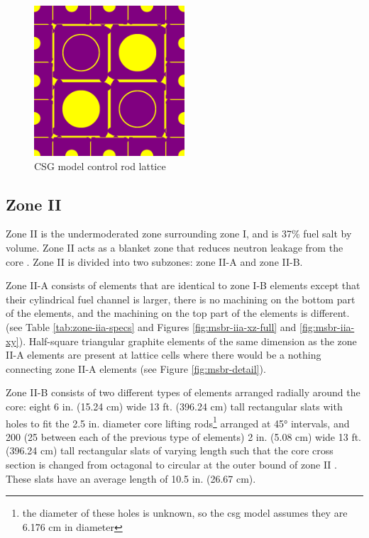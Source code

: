 \begin{figure}[htpb]
    \centering
    \includegraphics[width=0.5\textwidth]{figs/ch4/cr_xy_openmc.png}
    \caption{CSG model control rod lattice}
    \label{fig:control-rods}
\end{figure}


\subsection{Zone II}

Zone II is the undermoderated zone surrounding zone I, and is 37\% fuel salt by
volume. Zone II acts as a blanket zone that reduces neutron leakage from the
core \cite{robertson_conceptual_1971}. Zone II is divided into two subzones: zone
II-A and zone II-B.

Zone II-A consists of elements that are identical to zone I-B elements except
that their cylindrical fuel channel is larger, there is no machining on the bottom part of the elements, and the machining on the top part of the elements is different. (see Table \ref{tab:zone-iia-specs} and Figures \ref{fig:msbr-iia-xz-full} and \ref{fig:msbr-iia-xy}). Half-square triangular graphite elements of the same dimension as the zone II-A elements are present at lattice cells where there would be a nothing connecting zone II-A elements (see Figure \ref{fig:msbr-detail}). 

Zone II-B consists of two different types of elements arranged radially around the core: eight 6 in. (15.24 \unit{\centi\metre}) wide 13 ft. (396.24 \unit{\centi\metre}) tall rectangular slats with holes to fit the 2.5 in. diameter core lifting rods\footnote{the diameter of these holes is unknown, so the \Gls{csg} model assumes they are 6.176 cm in diameter} arranged at 45\unit{\degree} intervals, and 200 (25 between each of the previous type of elements) 2 in. (5.08 \unit{\centi\metre}) wide 13 ft. (396.24 \unit{\centi\metre})
tall rectangular slats of varying length such that the core cross section is
changed from octagonal to circular at the outer bound of zone
II \cite{robertson_conceptual_1971}. These slats have an average length of 10.5
in. (26.67 \unit{\centi\metre}).


